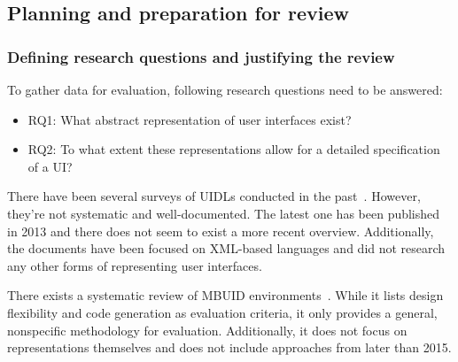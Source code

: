 \subsection[Planning and preparation]{Planning and preparation for review}\label{subsec:planning-and-preparation-for-review}

\subsubsection{Defining research questions and justifying the review}
To gather data for evaluation, following research questions need to be answered:
\begin{itemize}
    \item RQ1: What abstract representation of user interfaces exist?
    \item RQ2: To what extent these representations allow for a detailed specification of a UI?
\end{itemize}

There have been several surveys of UIDLs conducted in the past~\cite{Souchon2003, guerrero_garcia_theoretical_2009, guerrero_garcia_theoretical_2011, Jovanovic2013}.
However, they’re not systematic and well-documented.
The latest one has been published in 2013 and there does not seem to exist a more recent overview.
Additionally, the documents have been focused on XML-based languages and did not research any other forms of representing user interfaces.

There exists a systematic review of MBUID environments~\cite{Ruiz2018}.
While it lists design flexibility and code generation as evaluation criteria, it only provides a general, nonspecific methodology for evaluation.
Additionally, it does not focus on representations themselves and does not include approaches from later than 2015.

